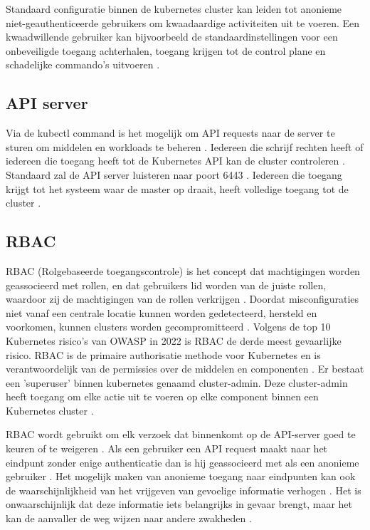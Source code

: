 Standaard configuratie binnen de kubernetes cluster kan leiden tot anonieme niet-geauthenticeerde gebruikers om kwaadaardige activiteiten uit te voeren. Een kwaadwillende gebruiker kan bijvoorbeeld de standaardinstellingen voor een onbeveiligde toegang achterhalen, toegang krijgen tot de control plane en schadelijke commando's uitvoeren \autocite{shamim2020xi}.

\subsection{API server}
Via de kubectl command is het mogelijk om API requests naar de server te sturen om middelen en workloads te beheren \autocite{KubernetesDocs-2023}. Iedereen die schrijf rechten heeft of iedereen die toegang heeft tot de Kubernetes API kan de cluster controleren \autocite{KubernetesDocs-2023}. 
Standaard zal de API server luisteren naar poort 6443 \autocite{KubernetesDocs-2023}. Iedereen die toegang krijgt tot het systeem waar de master op draait, heeft volledige toegang tot de cluster \autocite{Rice2018}. \newline

\subsection{RBAC}
RBAC (Rolgebaseerde toegangscontrole) is het concept dat machtigingen worden geassocieerd met rollen, en dat gebruikers lid worden van de juiste rollen, waardoor zij de machtigingen van de rollen verkrijgen \autocite{Sandhu1998}. Doordat misconfiguraties niet vanaf een centrale locatie kunnen worden gedetecteerd, hersteld en voorkomen, kunnen clusters worden gecompromitteerd \autocite{OWASP-2023}. Volgens de top 10 Kubernetes risico's van OWASP in 2022 is RBAC de derde meest gevaarlijke risico. RBAC is de primaire authorisatie methode voor Kubernetes en is verantwoordelijk van de permissies over de middelen en componenten \autocite{OWASP-2023}. Er bestaat een 'superuser' binnen kubernetes genaamd cluster-admin. Deze cluster-admin heeft toegang om elke actie uit te voeren op elke component binnen een Kubernetes cluster \autocite{OWASP-2023}. 

RBAC wordt gebruikt om elk verzoek dat binnenkomt op de API-server goed te keuren of te weigeren \autocite{mytilinakis2020attack}. Als een gebruiker een API request maakt naar het eindpunt zonder enige authenticatie dan is hij geassocieerd met als een anonieme gebruiker \autocite{mytilinakis2020attack}. Het mogelijk maken van anonieme toegang naar eindpunten kan ook de waarschijnlijkheid van het vrijgeven van gevoelige informatie verhogen \autocite{Rice2018}. Het is onwaarschijnlijk dat deze informatie iets belangrijks in gevaar brengt, maar het kan de aanvaller de weg wijzen naar andere zwakheden \autocite{Rice2018}.

